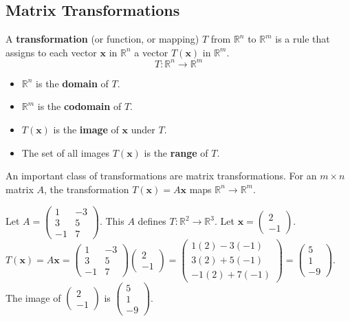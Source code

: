 \subsection{Matrix Transformations}
A \textbf{transformation} (or function, or mapping) $T$ from $\mathbb{R}^n$ to $\mathbb{R}^m$ is a rule that assigns to each vector $\mathbf{x}$ in $\mathbb{R}^n$ a vector $T(\mathbf{x})$ in $\mathbb{R}^m$.
\[ T: \mathbb{R}^n \to \mathbb{R}^m \]
\begin{itemize}
    \item $\mathbb{R}^n$ is the \textbf{domain} of $T$.
    \item $\mathbb{R}^m$ is the \textbf{codomain} of $T$.
    \item $T(\mathbf{x})$ is the \textbf{image} of $\mathbf{x}$ under $T$.
    \item The set of all images $T(\mathbf{x})$ is the \textbf{range} of $T$.
\end{itemize}

An important class of transformations are matrix transformations.
For an $m \times n$ matrix $A$, the transformation $T(\mathbf{x}) = A\mathbf{x}$ maps $\mathbb{R}^n \to \mathbb{R}^m$.

\begin{example}
Let $A = \begin{pmatrix} 1 & -3 \\ 3 & 5 \\ -1 & 7 \end{pmatrix}$. This $A$ defines $T: \mathbb{R}^2 \to \mathbb{R}^3$.
Let $\mathbf{x} = \begin{pmatrix} 2 \\ -1 \end{pmatrix}$.
$T(\mathbf{x}) = A\mathbf{x} = \begin{pmatrix} 1 & -3 \\ 3 & 5 \\ -1 & 7 \end{pmatrix} \begin{pmatrix} 2 \\ -1 \end{pmatrix} = \begin{pmatrix} 1(2) - 3(-1) \\ 3(2) + 5(-1) \\ -1(2) + 7(-1) \end{pmatrix} = \begin{pmatrix} 5 \\ 1 \\ -9 \end{pmatrix}$.
The image of $\begin{pmatrix} 2 \\ -1 \end{pmatrix}$ is $\begin{pmatrix} 5 \\ 1 \\ -9 \end{pmatrix}$.
\end{example}

